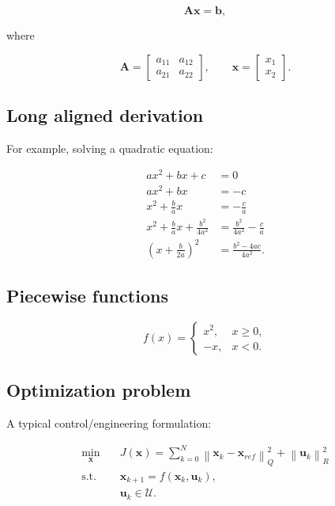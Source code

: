 \documentclass[10pt,a4paper]{scrartcl}
\begin{document}
  \begin{equation}
      \bm{A}\bm{x}=\bm{b},
  \end{equation}

  where

  \[
  \bm{A}=
  \begin{bmatrix}
  a_{11} & a_{12}\\
  a_{21} & a_{22}
  \end{bmatrix},
  \qquad
  \bm{x}=
  \begin{bmatrix}
  x_1\\
  x_2
  \end{bmatrix}.
  \]


  \subsection{Long aligned derivation}

  For example, solving a quadratic equation:

  \begin{align}
      ax^2+bx+c &=0\\
      ax^2+bx &= -c\\
      x^2+\frac{b}{a}x &= -\frac{c}{a}\\
      x^2+\frac{b}{a}x+\frac{b^2}{4a^2}
          &= \frac{b^2}{4a^2}-\frac{c}{a}\\
      \left(x+\frac{b}{2a}\right)^2
          &=\frac{b^2-4ac}{4a^2}.
  \end{align}


  \subsection{Piecewise functions}

  \[
  f(x)=
  \begin{cases}
      x^2, & x\geq0,\\
      -x, & x<0 .
  \end{cases}
  \]


  \subsection{Optimization problem}

  A typical control/engineering formulation:

  \begin{equation}
      \begin{aligned}
      \min_{\bm{x}}\quad&
          J(\bm{x})
          =
          \sum_{k=0}^{N}
          \left\|
          \bm{x}_k-\bm{x}_{ref}
          \right\|^2_Q
          +
          \left\|
          \bm{u}_k
          \right\|^2_R
          \\
      \text{s.t.}\quad&
          \bm{x}_{k+1}
          =
          f(\bm{x}_k,\bm{u}_k),\\
      &
          \bm{u}_k\in\mathcal{U}.
      \end{aligned}
  \end{equation}
\end{document}
